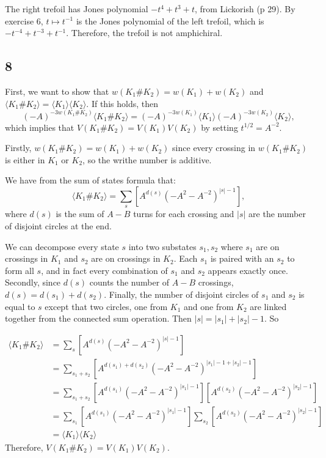 \documentclass{article}
\theoremstyle{definition}
\numberwithin{theorem}{section}
\numberwithin{equation}{section}
\begin{document}
The right trefoil has Jones polynomial $-t^4 + t^3 + t$, from Lickorish (p 29). By exercise 6,  $t \mapsto t^{-1}$ is the Jones polynomial of the left trefoil, which is $-t^{-4} + t^{-3} + t^{-1}$. Therefore, the trefoil is not amphichiral.

\subsection{8}

First, we want to show that $w(K_1 \# K_2) = w(K_1) + w(K_2)$ and $\langle K_1 \# K_2 \rangle = \langle K_1 \rangle\langle K_2 \rangle$. If this holds, then \[(-A)^{-3w(K_1 \# K_2)} \langle K_1 \# K_2 \rangle = (-A)^{-3w(K_1)} \langle K_1 \rangle (-A)^{-3w(K_2)} \langle K_2 \rangle,\] which implies that $V(K_1 \# K_2) = V(K_1) V(K_2)$ by setting $t^{1/2} = A^{-2}$. 

Firstly, $w(K_1 \# K_2) = w(K_1) + w(K_2)$ since every crossing in $w(K_1 \# K_2)$ is either in $K_1$ or $K_2$, so the writhe number is additive. 

We have from the sum of states formula that:
\[\langle K_1 \# K_2\rangle = \sum_{s}\left[A^{d(s)}(-A^2 - A^{-2})^{|s| - 1} \right],\] where $d(s)$ is the sum of $A - B$ turns for each crossing and $|s|$ are the number of disjoint circles at the end. 

We can decompose every state $s$ into two substates $s_1, s_2$ where $s_1$ are on crossings in $K_1$ and $s_2$ are on crossings in $K_2$. Each $s_1$ is paired with an $s_2$ to form all $s$, and in fact every combination of $s_1$ and $s_2$ appears exactly once. Secondly, since $d(s)$ counts the number of $A - B$ crossings, $d(s) = d(s_1) + d(s_2)$. Finally, the number of disjoint circles of $s_1$ and $s_2$ is equal to $s$ except that two circles, one from $K_1$ and one from $K_2$ are linked together from the connected sum operation. Then $|s| = |s_1| + |s_2| - 1$. So

\begin{align*}
    \langle K_1 \# K_2\rangle &= \sum_{s}\left[A^{d(s)}(-A^2 - A^{-2})^{|s| - 1} \right]\\
    &= \sum_{s_1 + s_2}\left[A^{d(s_1) + d(s_2)}(-A^2 - A^{-2})^{|s_1|- 1 + |s_2| - 1} \right]\\
    &= \sum_{s_1 + s_2}\left[A^{d(s_1)}(-A^2 - A^{-2})^{|s_1|- 1} \right] \left[A^{d(s_2)}(-A^2 - A^{-2})^{|s_2|- 1} \right]\\
    &= \sum_{s_1}\left[A^{d(s_1)}(-A^2 - A^{-2})^{|s_1|- 1} \right] \sum_{s_2}\left[A^{d(s_2)}(-A^2 - A^{-2})^{|s_2|- 1} \right]\\
    &= \langle K_1 \rangle \langle K_2 \rangle
\end{align*}
Therefore,  $V(K_1 \# K_2) = V(K_1) V(K_2)$.
\end{document}
